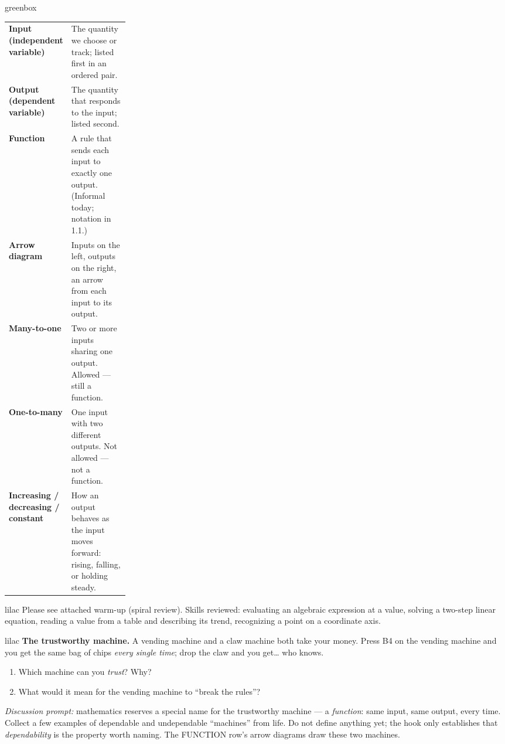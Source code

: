 \documentclass[10pt]{article}
\begin{document}
\begin{skillbox}{greenbox}
\renewcommand{\arraystretch}{1.4}
\begin{tabularx}{\linewidth}{@{} >{\leavevmode\bfseries\color{plum}}p{0.24\linewidth} X @{}}
Input (independent variable)  & The quantity we choose or track; listed first in an ordered pair. \\
Output (dependent variable)   & The quantity that responds to the input; listed second. \\
Function             & A rule that sends each input to exactly one output. (Informal today; notation in 1.1.) \\
Arrow diagram        & Inputs on the left, outputs on the right, an arrow from each input to its output. \\
Many-to-one          & Two or more inputs sharing one output. Allowed --- still a function. \\
One-to-many          & One input with two different outputs. Not allowed --- not a function. \\
Increasing / decreasing / constant & How an output behaves as the input moves forward: rising, falling, or holding steady. \\
\end{tabularx}
\end{skillbox}

\begin{skillbox}{lilac}
    Please see attached warm-up (spiral review).
    Skills reviewed: evaluating an algebraic expression at a value,
    solving a two-step linear equation,
    reading a value from a table and describing its trend,
    recognizing a point on a coordinate axis.
\end{skillbox}

\begin{skillbox}{lilac}
    \textbf{The trustworthy machine.} A vending machine and a claw machine both take
    your money. Press B4 on the vending machine and you get the same bag of chips
    \textit{every single time}; drop the claw and you get\ldots{} who knows.
    \begin{enumerate}[itemsep=2pt]
        \item Which machine can you \textit{trust}? Why?
        \item What would it mean for the vending machine to ``break the rules''?
    \end{enumerate}
    \textit{Discussion prompt:} mathematics reserves a special name for the
    trustworthy machine --- a \textit{function}: same input, same output, every time.
    Collect a few examples of dependable and undependable ``machines'' from life.
    Do not define anything yet; the hook only establishes that
    \textit{dependability} is the property worth naming. The FUNCTION row's arrow
    diagrams draw these two machines.
\end{skillbox}
\end{document}
